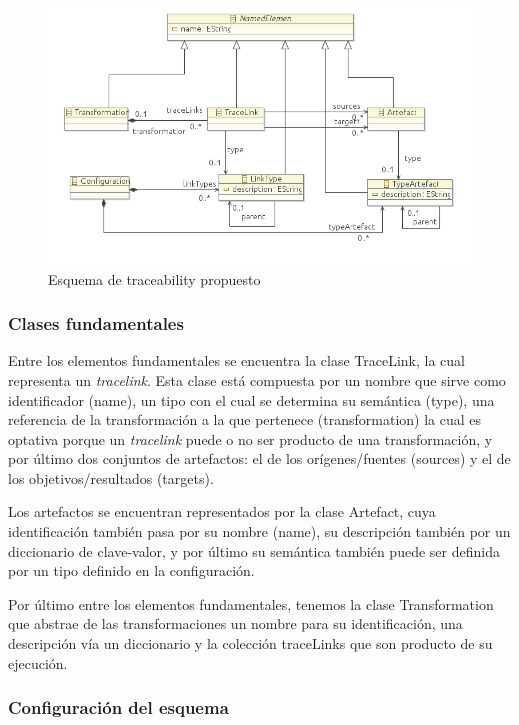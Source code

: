 \documentclass[a4paper,12pt,oneside,spanish]{book}
\begin{document}
\begin{figure}[hbtp]
\centering
\includegraphics[scale=0.76]{./img/Esquema}
\caption{Esquema de traceability propuesto}
\label{fig:EsquenaPropuesto}
\end{figure}


\subsubsection{Clases fundamentales}

Entre los elementos fundamentales se encuentra la clase \textsf{TraceLink}, la cual representa un \textit{tracelink}. Esta clase está compuesta por un nombre que sirve como identificador (\textsf{name}), un tipo con el cual se determina su semántica (\textsf{type}), una referencia de la transformación a la que pertenece (\textsf{transformation}) la cual es optativa porque un \textit{tracelink} puede o no ser producto de una transformación, y por último dos conjuntos de artefactos: el de los orígenes/fuentes (\textsf{sources}) y el de los objetivos/resultados (\textsf{targets}).

Los artefactos se encuentran representados por la clase \textsf{Artefact}, cuya identificación también pasa por su nombre (\textsf{name}), su descripción también por un diccionario de clave-valor, y por último su semántica también puede ser definida por un tipo definido en la configuración.

Por último entre los elementos fundamentales, tenemos la clase \textsf{Transformation} que abstrae de las transformaciones un nombre para su identificación, una descripción vía un diccionario y la colección \textsf{traceLinks} que son producto de su ejecución.


\subsubsection{Configuración del esquema}
\end{document}
